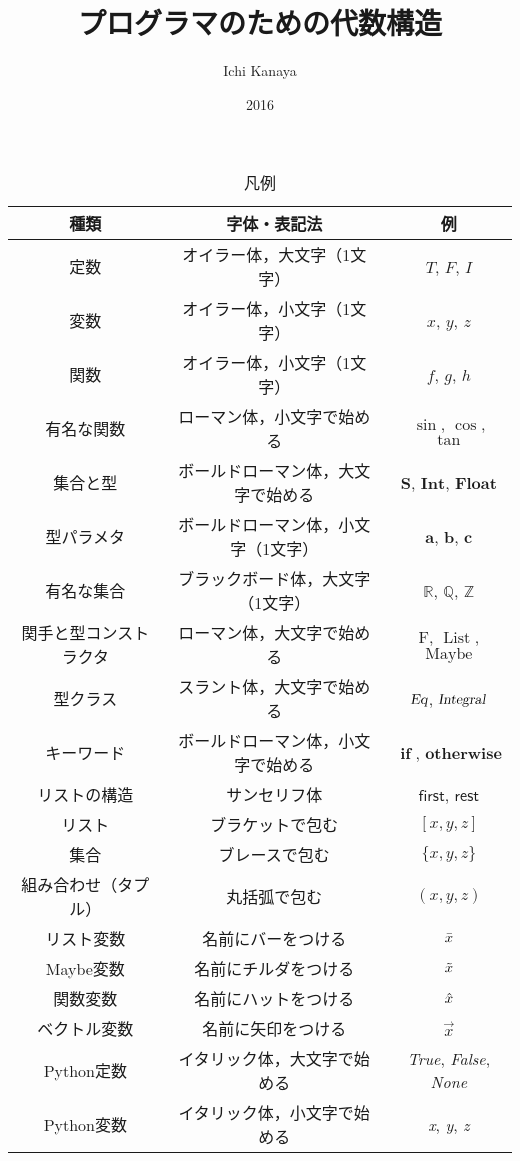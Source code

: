 \documentclass[twocolumn]{jsbook}
\title{プログラマのための代数構造}
\author{Ichi Kanaya}
\date{2016}
\newcommand{\pthnId}[1]{\textit{#1}}
\newcommand{\hsklType}[1]{\textbf{#1}}
\newcommand{\hsklTypeclass}[1]{\textsl{#1}}
\newcommand{\hsklTypeConstructor}[1]{\mathop{\mathrm{#1}}}
\DeclareMathOperator{\hsklListConstructor}{\hsklTypeConstructor{List}}
\DeclareMathOperator{\hsklMaybeConstructor}{\hsklTypeConstructor{Maybe}}
\newcommand{\hsklInt}{\hsklType{Int}}
\newcommand{\hsklIntegral}{\hsklTypeclass{Integral}}
\newcommand{\hsklEq}{\hsklTypeclass{Eq}}
\newcommand{\hsklFloat}{\hsklType{Float}}
\newcommand{\hsklFunction}[1]{\Hat{#1}}
\newcommand{\hsklList}[1]{\Bar{#1}}
\newcommand{\hsklMaybe}[1]{\Tilde{#1}}
\newcommand{\mathKeyword}[1]{\mathbf{#1}}
\newcommand{\mathVarKeyword}[1]{\mathsf{#1}}
\DeclareMathOperator{\mathIf}{\mathKeyword{if}}
\newcommand{\mathFirst}{\mathVarKeyword{first}}
\newcommand{\mathOtherwise}{\mathKeyword{otherwise}}
\newcommand{\mathRest}{\mathVarKeyword{rest}}
\newcommand{\mathFunctor}[1]{\mathrm{#1}}
\newcommand{\mathSet}[1]{\mathbf{#1}}
\newcommand{\mathSpecialSet}[1]{\mathbb{#1}}
\newcommand{\mathVector}[1]{\vec{#1}}
\begin{document}
\setlength{\baselineskip}{17pt}
\maketitle
\tableofcontents

\begin{table*}
\caption{凡例}
\begin{center}
\begin{tabular}{||c|c|c||}
\hline
種類&字体・表記法&例\\
\hline
定数&オイラー体，大文字（1文字）&$T$, $F$, $I$\\
変数&オイラー体，小文字（1文字）&$x$, $y$, $z$\\
関数&オイラー体，小文字（1文字）&$f$, $g$, $h$\\
有名な関数&ローマン体，小文字で始める&$\sin$, $\cos$, $\tan$\\
集合と型&ボールドローマン体，大文字で始める&$\mathSet{S}$, $\hsklInt$, $\hsklFloat$\\
型パラメタ&ボールドローマン体，小文字（1文字）&$\hsklType{a}$, $\hsklType{b}$, $\hsklType{c}$\\
有名な集合&ブラックボード体，大文字（1文字）&$\mathSpecialSet{R}$, $\mathSpecialSet{Q}$, $\mathSpecialSet{Z}$\\
関手と型コンストラクタ&ローマン体，大文字で始める&$\mathFunctor{F}$, $\hsklListConstructor$, $\hsklMaybeConstructor$\\
型クラス&スラント体，大文字で始める&$\hsklEq$, $\hsklIntegral$\\
キーワード&ボールドローマン体，小文字で始める&$\mathIf$, $\mathOtherwise$\\
リストの構造&サンセリフ体&$\mathFirst$, $\mathRest$\\
\hline
リスト&ブラケットで包む&$[x,y,z]$\\
集合&ブレースで包む&$\{x,y,z\}$\\
組み合わせ（タプル）&丸括弧で包む&$(x,y,z)$\\
\hline
リスト変数&名前にバーをつける&$\hsklList{x}$\\
Maybe変数&名前にチルダをつける&$\hsklMaybe{x}$\\
関数変数&名前にハットをつける&$\hsklFunction{x}$\\
ベクトル変数&名前に矢印をつける&$\mathVector{x}$\\
\hline
Python定数&イタリック体，大文字で始める&\pthnId{True}, \pthnId{False}, \pthnId{None}\\
Python変数&イタリック体，小文字で始める&\pthnId{x}, \pthnId{y}, \pthnId{z}\\

\end{tabular}
\end{center}
\end{table*}
\end{document}
